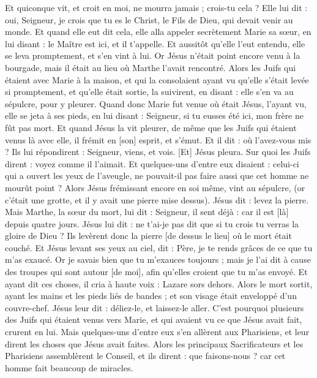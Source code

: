\begin{multicols}{2}
Et quiconque vit, et croit en moi, ne mourra jamais ; crois-tu cela ?
Elle lui dit : oui, Seigneur, je crois que tu es le Christ, le Fils de Dieu, qui devait venir au monde.
Et quand elle eut dit cela, elle alla appeler secrètement Marie sa sœur, en lui disant : le Maître est ici, et il t'appelle.
Et aussitôt qu'elle l'eut entendu, elle se leva promptement, et s'en vint à lui.
Or Jésus n'était point encore venu à la bourgade, mais il était au lieu où Marthe l'avait rencontré.
Alors les Juifs qui étaient avec Marie à la maison, et qui la consolaient ayant vu qu'elle s'était levée si promptement, et qu'elle était sortie, la suivirent, en disant : elle s'en va au sépulcre, pour y pleurer.
Quand donc Marie fut venue où était Jésus, l'ayant vu, elle se jeta à ses pieds, en lui disant : Seigneur, si tu eusses été ici, mon frère ne fût pas mort.
Et quand Jésus la vit pleurer, de même que les Juifs qui étaient venus là avec elle, il frémit en [son] esprit, et s'émut.
Et il dit : où l'avez-vous mis ? Ils lui répondirent : Seigneur, viens, et vois.
[Et] Jésus pleura.
Sur quoi les Juifs dirent : voyez comme il l'aimait.
Et quelques-uns d'entre eux disaient : celui-ci qui a ouvert les yeux de l'aveugle, ne pouvait-il pas faire aussi que cet homme ne mourût point ?
Alors Jésus frémissant encore en soi même, vint au sépulcre, (or c'était une grotte, et il y avait une pierre mise dessus).
Jésus dit : levez la pierre. Mais Marthe, la sœur du mort, lui dit : Seigneur, il sent déjà : car il est [là] depuis quatre jours.
Jésus lui dit : ne t'ai-je pas dit que si tu crois tu verras la gloire de Dieu ?
Ils levèrent donc la pierre [de dessus le lieu] où le mort était couché. Et Jésus levant ses yeux au ciel, dit : Père, je te rends grâces de ce que tu m'as exaucé.
Or je savais bien que tu m'exauces toujours ; mais je l'ai dit à cause des troupes qui sont autour [de moi], afin qu'elles croient que tu m'as envoyé.
Et ayant dit ces choses, il cria à haute voix : Lazare sors dehors.
Alors le mort sortit, ayant les mains et les pieds liés de bandes ; et son visage était enveloppé d'un couvre-chef. Jésus leur dit : déliez-le, et laissez-le aller.
C'est pourquoi plusieurs des Juifs qui étaient venus vers Marie, et qui avaient vu ce que Jésus avait fait, crurent en lui.
Mais quelques-uns d'entre eux s'en allèrent aux Pharisiens, et leur dirent les choses que Jésus avait faites.
Alors les principaux Sacrificateurs et les Pharisiens assemblèrent le Conseil, et ils dirent : que faisons-nous ? car cet homme fait beaucoup de miracles.

\end{multicols}
